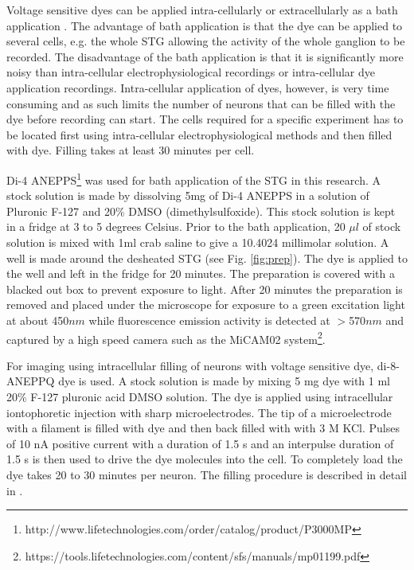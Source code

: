 Voltage sensitive dyes can be applied intra-cellularly \cite{Stein2011} or extracellularly as a bath application \cite{Staedele2012}. The advantage of bath application is that the dye can be applied to several cells, e.g. the whole \ac{STG} allowing the activity of the whole ganglion to be recorded. The disadvantage of the bath application is that it is significantly more noisy than intra-cellular electrophysiological recordings or intra-cellular dye application recordings. Intra-cellular application of dyes, however, is very time consuming and as such limits the number of neurons that can be filled with the dye before recording can start. The cells required for a specific experiment has to be located first using intra-cellular electrophysiological methods and then filled with dye. Filling takes at least 30 minutes per cell. 

Di-4 ANEPPS\footnote{http://www.lifetechnologies.com/order/catalog/product/P3000MP} was used for bath application of the \ac{STG} in this research. A stock solution is made by dissolving 5mg of Di-4 ANEPPS  in a solution of Pluronic F-127 and 20\% DMSO (dimethylsulfoxide). This stock solution is kept in a fridge at 3 to 5 degrees Celsius. Prior to the bath application, 20 $\mu l$ of stock solution is mixed with 1ml crab saline to give a 10.4024 millimolar solution. A well is made around the desheated \ac{STG} (see Fig. \ref{fig:prep}). The dye is applied to the well and left in the fridge for 20 minutes. The preparation is covered with a blacked out box to prevent exposure to light. After 20 minutes the preparation is removed and placed under the microscope for exposure to a green excitation light at about 450$nm$ while fluorescence emission activity is detected at $>$570$nm$ and captured by a high speed camera such as the MiCAM02 system\footnote{https://tools.lifetechnologies.com/content/sfs/manuals/mp01199.pdf}. 

For imaging using intracellular filling of neurons with voltage sensitive dye, di-8-ANEPPQ dye is used. A stock solution is made by mixing 5 mg dye with 1 ml 20\% F-127 pluronic acid DMSO solution. The dye is applied using intracellular iontophoretic injection with sharp microelectrodes. The tip of a microelectrode with a filament is filled with dye and then back filled with with 3 M KCl. Pulses of 10 nA positive current with a duration of 1.5 s and an interpulse duration of 1.5 s is then used to drive the dye molecules into the cell. To completely load the dye takes 20 to 30 minutes per neuron. The filling procedure is described in detail in \cite{Stein2011}.

